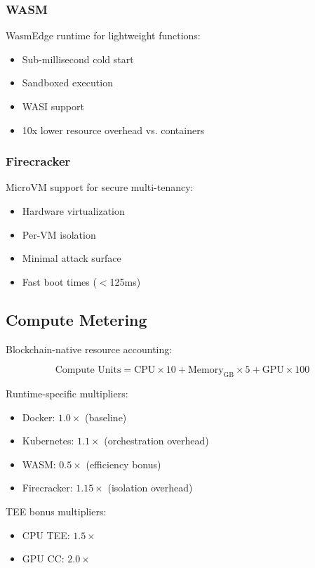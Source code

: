 \documentclass[11pt,twocolumn]{article}
\begin{document}
\subsubsection{WASM}

WasmEdge runtime for lightweight functions:
\begin{itemize}
\item Sub-millisecond cold start
\item Sandboxed execution
\item WASI support
\item 10x lower resource overhead vs. containers
\end{itemize}

\subsubsection{Firecracker}

MicroVM support for secure multi-tenancy:
\begin{itemize}
\item Hardware virtualization
\item Per-VM isolation
\item Minimal attack surface
\item Fast boot times ($<$125ms)
\end{itemize}

\subsection{Compute Metering}

Blockchain-native resource accounting:

\begin{equation}
\text{Compute Units} = \text{CPU} \times 10 + \text{Memory}_{\text{GB}} \times 5 + \text{GPU} \times 100
\end{equation}

Runtime-specific multipliers:
\begin{itemize}
\item Docker: $1.0\times$ (baseline)
\item Kubernetes: $1.1\times$ (orchestration overhead)
\item WASM: $0.5\times$ (efficiency bonus)
\item Firecracker: $1.15\times$ (isolation overhead)
\end{itemize}

TEE bonus multipliers:
\begin{itemize}
\item CPU TEE: $1.5\times$
\item GPU CC: $2.0\times$
\end{itemize}
\end{document}
